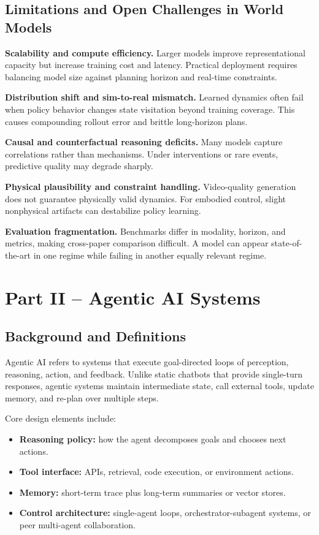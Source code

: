\documentclass[conference]{IEEEtran}
\begin{document}
\subsection{Limitations and Open Challenges in World Models}
\textbf{Scalability and compute efficiency.} Larger models improve representational capacity but increase training cost and latency. Practical deployment requires balancing model size against planning horizon and real-time constraints.

\textbf{Distribution shift and sim-to-real mismatch.} Learned dynamics often fail when policy behavior changes state visitation beyond training coverage. This causes compounding rollout error and brittle long-horizon plans.

\textbf{Causal and counterfactual reasoning deficits.} Many models capture correlations rather than mechanisms. Under interventions or rare events, predictive quality may degrade sharply.

\textbf{Physical plausibility and constraint handling.} Video-quality generation does not guarantee physically valid dynamics. For embodied control, slight nonphysical artifacts can destabilize policy learning.

\textbf{Evaluation fragmentation.} Benchmarks differ in modality, horizon, and metrics, making cross-paper comparison difficult. A model can appear state-of-the-art in one regime while failing in another equally relevant regime.

\section{Part II -- Agentic AI Systems}
\subsection{Background and Definitions}
Agentic AI refers to systems that execute goal-directed loops of perception, reasoning, action, and feedback. Unlike static chatbots that provide single-turn responses, agentic systems maintain intermediate state, call external tools, update memory, and re-plan over multiple steps.

Core design elements include:
\begin{itemize}
\item \textbf{Reasoning policy:} how the agent decomposes goals and chooses next actions.
\item \textbf{Tool interface:} APIs, retrieval, code execution, or environment actions.
\item \textbf{Memory:} short-term trace plus long-term summaries or vector stores.
\item \textbf{Control architecture:} single-agent loops, orchestrator-subagent systems, or peer multi-agent collaboration.
\end{itemize}
\end{document}
